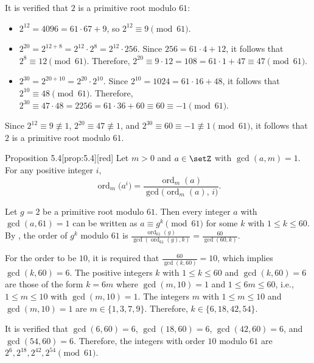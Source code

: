 \begin{enumerate}
\begin{subanswer}
    It is verified that $2$ is a primitive root modulo $61$:
    \begin{itemize}
      \item $2^{12} = 4096 = 61 \cdot 67 + 9$, so $2^{12} \equiv 9 \pmod{61}$.
      \item $2^{20} = 2^{12+8} = 2^{12} \cdot 2^8 = 2^{12} \cdot 256$. Since $256 = 61 \cdot 4 + 12$, it follows that $2^8 \equiv 12 \pmod{61}$.
      Therefore, $2^{20} \equiv 9 \cdot 12 = 108 = 61 \cdot 1 + 47 \equiv 47 \pmod{61}$.
      \item $2^{30} = 2^{20+10} = 2^{20} \cdot 2^{10}$. Since $2^{10} = 1024 = 61 \cdot 16 + 48$, it follows that $2^{10} \equiv 48 \pmod{61}$.
      Therefore, $2^{30} \equiv 47 \cdot 48 = 2256 = 61 \cdot 36 + 60 \equiv 60 \equiv -1 \pmod{61}$.
    \end{itemize}
    Since $2^{12} \equiv 9 \not\equiv 1$, $2^{20} \equiv 47 \not\equiv 1$, and $2^{30} \equiv 60 \equiv -1 \not\equiv 1 \pmod{61}$, it follows that $2$ is a primitive root modulo $61$.
    
    \begin{define}{Proposition 5.4}[prop:5.4][red]
      Let $m>0$ and $a\in\setZ$ with $\gcd(a,m)=1$. For any positive integer $i$,
      \[
      \operatorname{ord}_m\!\bigl(a^i\bigr)=\frac{\operatorname{ord}_m(a)}{\gcd\bigl(\operatorname{ord}_m(a),\,i\bigr)}.
      \]
    \end{define}

    Let $g = 2$ be a primitive root modulo $61$. Then every integer $a$ with $\gcd(a, 61) = 1$ can be written as $a \equiv g^k \pmod{61}$ for some $k$ with $1 \leq k \leq 60$.
    By , the order of $g^k$ modulo $61$ is $\frac{\operatorname{ord}_{61}(g)}{\gcd(\operatorname{ord}_{61}(g), k)} = \frac{60}{\gcd(60, k)}$.
    
    For the order to be $10$, it is required that $\frac{60}{\gcd(k, 60)} = 10$, which implies $\gcd(k, 60) = 6$.
    The positive integers $k$ with $1 \leq k \leq 60$ and $\gcd(k, 60) = 6$ are those of the form $k = 6m$ where $\gcd(m, 10) = 1$ and $1 \leq 6m \leq 60$, i.e., $1 \leq m \leq 10$ with $\gcd(m, 10) = 1$.
    The integers $m$ with $1 \leq m \leq 10$ and $\gcd(m, 10) = 1$ are $m \in \{1, 3, 7, 9\}$.
    Therefore, $k \in \{6, 18, 42, 54\}$.
    
    It is verified that $\gcd(6, 60) = 6$, $\gcd(18, 60) = 6$, $\gcd(42, 60) = 6$, and $\gcd(54, 60) = 6$.
    Therefore, the integers with order $10$ modulo $61$ are $2^6, 2^{18}, 2^{42}, 2^{54} \pmod{61}$.
    

\end{subanswer}
\end{enumerate}
